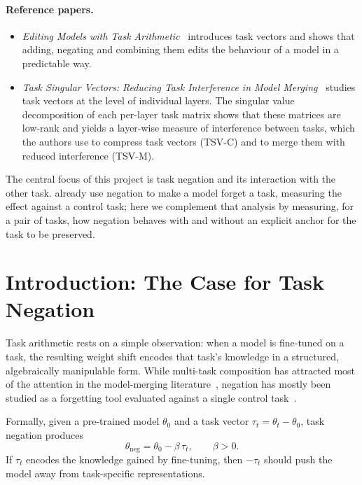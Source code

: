 \documentclass[11pt,a4paper,twocolumn]{article}
\begin{document}
\paragraph{Reference papers.}
\begin{itemize}
  \item \emph{Editing Models with Task Arithmetic}~\citep{ilharco2023}
  introduces task vectors and shows that adding, negating and combining
  them edits the behaviour of a model in a predictable way.
  \item \emph{Task Singular Vectors: Reducing Task Interference in Model
  Merging}~\citep{gargiulo2025} studies task vectors at the level of
  individual layers. The singular value decomposition of each per-layer
  task matrix shows that these matrices are low-rank and yields a
  layer-wise measure of interference between tasks, which the authors use
  to compress task vectors (TSV-C) and to merge them with reduced
  interference (TSV-M).
\end{itemize}

The central focus of this project is task negation and its interaction
with the other task. \citet{ilharco2023} already use negation to make a
model forget a task, measuring the effect against a control task; here we
complement that analysis by measuring, for a pair of tasks, how negation
behaves with and without an explicit anchor for the task to be preserved.

\section{Introduction: The Case for Task Negation}

Task arithmetic rests on a simple observation: when a model is fine-tuned
on a task, the resulting weight shift encodes that task's knowledge in a
structured, algebraically manipulable form. While multi-task composition
has attracted most of the attention in the model-merging
literature~\citep{ilharco2023,gargiulo2025},
negation has mostly been studied as a forgetting tool evaluated against a
single control task~\citep{ilharco2023}.

Formally, given a pre-trained model $\theta_0$ and a task vector
$\tau_t=\theta_t-\theta_0$, task negation produces
\begin{equation}
  \theta_{\text{neg}} = \theta_0 - \beta\,\tau_t, \qquad \beta>0 .
\end{equation}
If $\tau_t$ encodes the knowledge gained by fine-tuning, then $-\tau_t$
should push the model away from task-specific representations.
\end{document}
